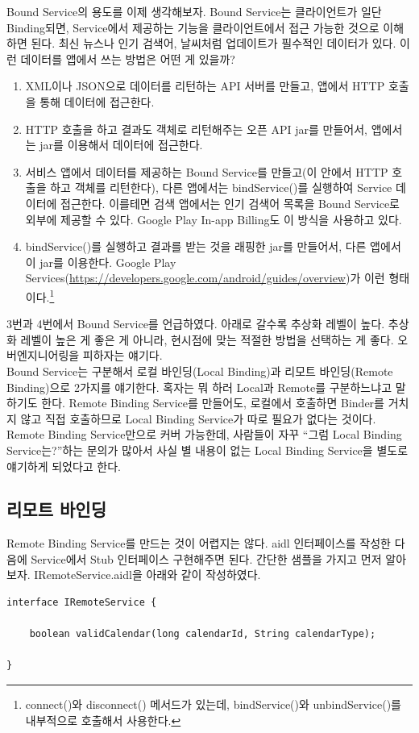 Bound Service의 용도를 이제 생각해보자.
Bound Service는 클라이언트가 일단 Binding되면, Service에서 제공하는 기능을 클라이언트에서 접근 가능한 것으로 이해하면 된다.
최신 뉴스나 인기 검색어, 날씨처럼 업데이트가 필수적인 데이터가 있다. 이런 데이터를 앱에서 쓰는 방법은 어떤 게 있을까?
\begin{enumerate}
\item XML이나 JSON으로 데이터를 리턴하는 API 서버를 만들고, 앱에서 HTTP 호출을 통해 데이터에 접근한다.
\item HTTP 호출을 하고 결과도 객체로 리턴해주는 오픈 API jar를 만들어서, 앱에서는 jar를 이용해서 데이터에 접근한다.
\item 서비스 앱에서 데이터를 제공하는 Bound Service를 만들고(이 안에서 HTTP 호출을 하고 객체를 리턴한다), 다른 앱에서는 bindService()를 실행하여 Service 데이터에 접근한다. 이를테면 검색 앱에서는 인기 검색어 목록을 Bound Service로 외부에 제공할 수 있다.
Google Play In-app Billing도 이 방식을 사용하고 있다.
\item bindService()를 실행하고 결과를 받는 것을 래핑한 jar를 만들어서, 다른 앱에서 이 jar를 이용한다. Google Play Services(\url{https://developers.google.com/android/guides/overview})가 이런 형태이다.\footnote{connect()와 disconnect() 메서드가 있는데, bindService()와 unbindService()를 내부적으로 호출해서 사용한다.}
\end{enumerate}
3번과 4번에서 Bound Service를 언급하였다. 
아래로 갈수록 추상화 레벨이 높다. 추상화 레벨이 높은 게 좋은 게 아니라, 현시점에 맞는 적절한 방법을 선택하는 게 좋다. 오버엔지니어링을 피하자는 얘기다.\\

Bound Service는 구분해서 로컬 바인딩(Local Binding)과 리모트 바인딩(Remote Binding)으로 2가지를 얘기한다.
혹자는 뭐 하러 Local과 Remote를 구분하느냐고 말하기도 한다.
Remote Binding Service를 만들어도, 로컬에서 호출하면 Binder를 거치지 않고 직접 호출하므로 Local Binding Service가 따로 필요가 없다는 것이다. Remote Binding Service만으로 커버 가능한데, 사람들이 자꾸 ``그럼 Local Binding Service는?''하는 문의가 많아서 사실 별 내용이 없는 Local Binding Service을 별도로 얘기하게 되었다고 한다.\\

\subsection{리모트 바인딩}
Remote Binding Service를 만드는 것이 어렵지는 않다. aidl 인터페이스를 작성한 다음에 Service에서 Stub 인터페이스 구현해주면 된다.
간단한 샘플을 가지고 먼저 알아보자. 
IRemoteService.aidl을 아래와 같이 작성하였다. 
\begin{lstlisting}[frame=single]
interface IRemoteService {

	boolean validCalendar(long calendarId, String calendarType);
		
}
\end{lstlisting}

